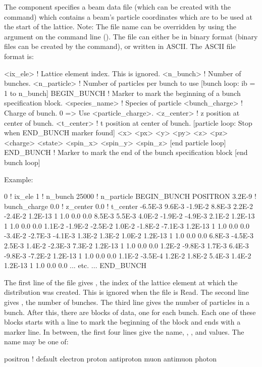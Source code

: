 {{{{{{{{{{{{\label{s:beamfile}
The  component specifies a beam data file (which can be
created with the  command) which
contains a beam's particle coordinates which are to be used at the
start of the lattice.  Note: The file name can be overridden by using
the  argument on the command line
(). The file can either be in binary format
(binary files can be created by the  command), or
written in ASCII. The ASCII file format is:
\begin{example}
  <ix_ele>         ! Lattice element index. This is ignored.
  <n_bunch>        ! Number of bunches.
  <n_particle>     ! Number of particles per bunch to use
  [bunch loop: ib = 1 to n_bunch]
    BEGIN_BUNCH    ! Marker to mark the beginning of a bunch specification block.
    <species_name> ! Species of particle
    <bunch_charge> ! Charge of bunch. 0 => Use <particle_charge>.
    <z_center>     ! z position at center of bunch.
    <t_center>     ! t position at center of bunch.
    [particle loop: Stop when END_BUNCH marker found]
      <x> <px> <y> <py> <z> <pz> <charge> <state> <spin_x> <spin_y> <spin_z> 
    [end particle loop]
    END_BUNCH      ! Marker to mark the end of the bunch specification block
  [end bunch loop]
\end{example}
Example:
\begin{example}
  0       ! ix_ele
  1       ! n_bunch
  25000   ! n_particle
  BEGIN_BUNCH
    POSITRON
    3.2E-9   ! bunch_charge
    0.0      ! z_center
    0.0      ! t_center
   -6.5E-3  9.6E-3 -1.9E-2  8.8E-3  2.2E-2 -2.4E-2  1.2E-13  1 1.0 0.0 0.0
    8.5E-3  5.5E-3  4.0E-2 -1.9E-2 -4.9E-3  2.1E-2  1.2E-13  1 1.0 0.0 0.0
    1.1E-2 -1.9E-2 -2.5E-2  1.0E-2 -1.8E-2 -7.1E-3  1.2E-13  1 1.0 0.0 0.0
   -3.4E-2 -2.7E-3 -4.1E-3  1.3E-2  1.3E-2  1.0E-2  1.2E-13  1 1.0 0.0 0.0
    6.8E-3 -4.5E-3  2.5E-3  1.4E-2 -2.3E-3  7.3E-2  1.2E-13  1 1.0 0.0 0.0
    1.2E-2 -9.8E-3  1.7E-3  6.4E-3 -9.8E-3 -7.2E-2  1.2E-13  1 1.0 0.0 0.0
    1.1E-2 -3.5E-4  1.2E-2  1.8E-2  5.4E-3  1.4E-2  1.2E-13  1 1.0 0.0 0.0
       ... etc. ...
  END_BUNCH
\end{example}

The first line of the file gives , the index of the lattice
element at which the distribution was created. This is ignored when
the file is Read. The second line gives , the number
of bunches. The third line gives  the number of
particles in a bunch. After this, there are  blocks of
data, one for each bunch. Each one of these blocks starts with a
 line to mark the beginning of the block and ends with
a  marker line. In between, the first four lines give
the  name, , , and
 values. The  name may be one of:
\begin{example}
  positron  ! default
  electron
  proton
  antiproton
  muon
  antimuon
  photon
\end{example}

}}}}}}}}}}}}
